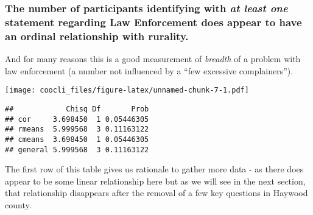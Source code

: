 \documentclass[
]{book}
\begin{document}
\hypertarget{the-number-of-participants-identifying-with-at-least-one-statement-regarding-law-enforcement-does-appear-to-have-an-ordinal-relationship-with-rurality.}{%
\subsubsection{\texorpdfstring{The number of participants identifying with \emph{at least one} statement regarding Law Enforcement does appear to have an ordinal relationship with rurality.}{The number of participants identifying with at least one statement regarding Law Enforcement does appear to have an ordinal relationship with rurality.}}\label{the-number-of-participants-identifying-with-at-least-one-statement-regarding-law-enforcement-does-appear-to-have-an-ordinal-relationship-with-rurality.}}

And for many reasons this is a good measurement of \emph{breadth} of a problem with law enforcement (a number not influenced by a ``few excessive complainers'').

\texttt{[image: coocli\_files/figure-latex/unnamed-chunk-7-1.pdf]}

\begin{verbatim}
##            Chisq Df       Prob
## cor     3.698450  1 0.05446305
## rmeans  5.999568  3 0.11163122
## cmeans  3.698450  1 0.05446305
## general 5.999568  3 0.11163122
\end{verbatim}

The first row of this table gives us rationale to gather more data - as there does appear to be some linear relationship here but as we will see in the next section, that relationship disappears after the removal of a few key questions in Haywood county.
\end{document}
